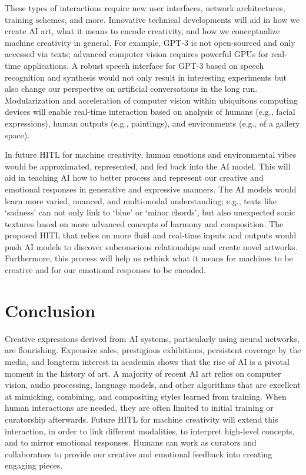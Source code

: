 \documentclass[letterpaper]{article} %
\begin{document}
These types of interactions require new user interfaces, network architectures, training schemes, and more. Innovative technical developments will aid in how we create AI art, what it means to encode creativity, and how we conceptualize machine creativity in general. For example, GPT-3 is not open-sourced and only accessed via texts; advanced computer vision requires powerful GPUs for real-time applications. A robust speech interface for GPT-3 based on speech recognition and synthesis would not only result in interesting experiments but also change our perspective on artificial conversations in the long run. Modularization and acceleration of computer vision within ubiquitous computing devices will enable real-time interaction based on analysis of humans (e.g., facial expressions), human outputs (e.g., paintings), and environments (e.g., of a gallery space). 

In future HITL for machine creativity, human emotions and environmental vibes would be approximated, represented, and fed back into the AI model. This will aid in teaching AI how to better process and represent our creative and emotional responses in generative and expressive manners. The AI models would learn more varied, nuanced, and multi-modal understanding; e.g., texts like `sadness' can not only link to `blue' or `minor chords', but also unexpected sonic textures based on more advanced concepts of harmony and composition. The proposed HITL that relies on more fluid and real-time inputs and outputs would push AI models to discover subconscious relationships and create novel artworks. Furthermore, this process will help us rethink what it means for machines to be creative and for our emotional responses to be encoded.

\section{Conclusion}
\label{conclusion}

Creative expressions derived from AI systems, particularly using neural networks, are flourishing. Expensive sales, prestigious exhibitions, persistent coverage by the media, and longterm interest in academia shows that the rise of AI is a pivotal moment in the history of art. A majority of recent AI art relies on computer vision, audio processing, language models, and other algorithms that are excellent at mimicking, combining, and compositing styles learned from training. When human interactions are needed, they are often limited to initial training or curatorship afterwards. Future HITL for machine creativity will extend this interaction, in order to link different modalities, to interpret high-level concepts, and to mirror emotional responses. Humans can work as curators and collaborators to provide our creative and emotional feedback into creating engaging pieces.
\end{document}
